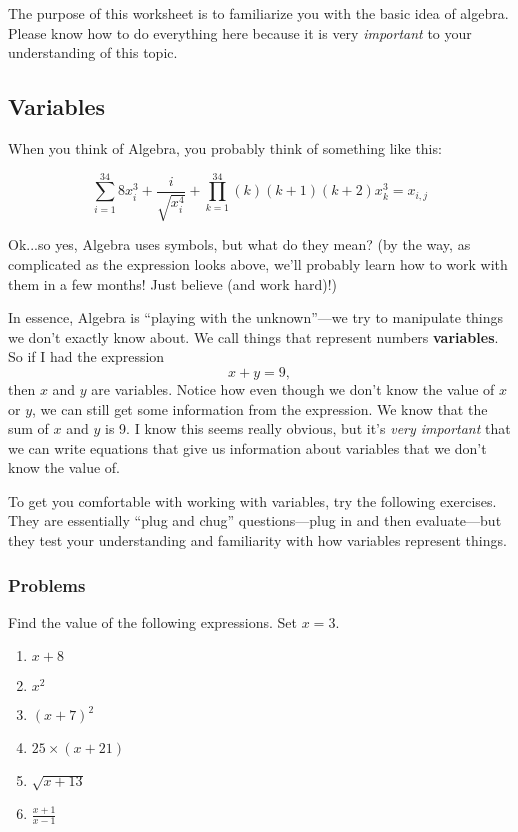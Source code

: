 The purpose of this worksheet is to familiarize you with the basic idea of algebra. Please know how to do everything here because it is very \textit{important} to your understanding of this topic.

\subsection{Variables}
When you think of Algebra, you probably think of something like this:

$$\sum_{i=1}^{34} 8x_{i}^{3}+\frac{i}{\sqrt{x_{i}^4}}+\prod_{k=1}^{34} (k)(k+1)(k+2)x_{k}^3 = x_{i,j}$$

Ok...so yes, Algebra uses symbols, but what do they mean? (by the way, as complicated as the expression looks above, we'll probably learn how to work with them in a few months! Just believe (and work hard)!)

In essence, Algebra is ``playing with the unknown''---we try to manipulate things we don't exactly know about. We call things that represent numbers \textbf{variables}. So if I had the expression
$$x+y=9,$$
then $x$ and $y$ are variables. Notice how even though we don't know the value of $x$ or $y$, we can still get some information from the expression. We know that the sum of $x$ and $y$ is 9. I know this seems really obvious, but it's \textit{very important} that we can write equations that give us information about variables that we don't know the value of.

To get you comfortable with working with variables, try the following exercises. They are essentially ``plug and chug'' questions---plug in and then evaluate---but they test your understanding and familiarity with how variables represent things.

\subsubsection{Problems}
Find the value of the following expressions. Set $x=3$.
\begin{multicols}{2}
\begin{enumerate}
\item $x+8$
\item $x^2$
\item $(x+7)^2$
\item $25\times(x+21)$
\item $\sqrt{x+13}$
\item $\frac{x+1}{x-1}$
\end{enumerate}
\end{multicols}

